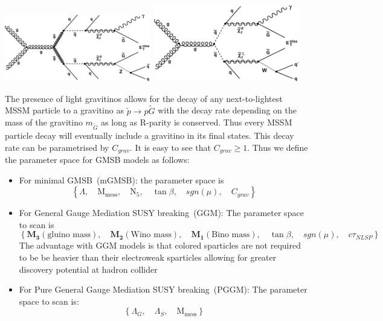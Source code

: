{\begin{center}
\centering
\mbox{\includegraphics[width=2.5in]{THESISPLOTS/SinglePhoton_gluino.pdf} \quad \quad
\includegraphics[width=2.5in]{THESISPLOTS/SinglePhoton_squark.pdf}}
\label{fig:feynman_grav}
\end{center}

The presence of light gravitinos allows for the decay of any next-to-lightest MSSM particle to a gravitino as $\tilde{p}\rightarrow p\tilde{G}$ with the decay rate depending on the mass of the gravitino $m_{\tilde{G}}$ as long as R-parity is conserved. Thus  every MSSM particle decay will eventually include a gravitino in its final states. This decay rate can be parametrised by $C_{grav}$. It is easy to see that $C_{grav} \geq 1$.
Thus we define the parameter space for GMSB models as follows:
\begin{itemize}
\item For minimal GMSB~(mGMSB): the parameter space is 
\begin{equation}\label{mGMSB}
\left\{ \Lambda, \quad \mathrm{M}_{\mbox{mess}},\quad \mathrm{N_{5}}, \quad \tan\beta, \quad sgn(\mu),\quad C_{grav}\right\}
 \end{equation}
 
 \item For General Gauge Mediation SUSY breaking~(GGM): The parameter space to scan is  \cite{PMeade,PMeade1}
 \begin{equation}\label{GGM}
 \left\{\mathbf{M_{3}}(\mbox{gluino mass}), \quad \mathbf{M_{2}}(\mbox{Wino mass}), \quad \mathbf{M_{1}}(\mbox{Bino mass}), \quad \tan\beta, \quad sgn(\mu),\quad c\tau_{NLSP}\right\}
 \end{equation}
The advantage with GGM models is that colored sparticles are not required to be be heavier than their electroweak sparticles allowing for greater discovery potential at hadron collider\cite{DSHIH}
\item For Pure General Gauge Mediation SUSY breaking~(PGGM): The parameter space to scan is:
\begin{equation}\label{PGGM}
\left\{\Lambda_{G},\quad \Lambda_{S}, \quad \mathrm{M}_{\mbox{mess}}\right\}
 \end{equation}
 

\end{itemize}}
